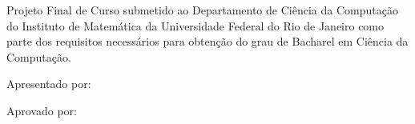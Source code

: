 \documentclass[brazil,pagestart=firstchapter]{abnt}
\begin{document}


\capa

\folhaderosto


\begin{folhadeaprovacao}

\setlength{\ABNTsignthickness}{0.4pt}
\setlength{\ABNTsignskip}{2cm}
\hspace*{1cm}

\centerline{\textbf{\large \ABNTtitulodata}}

\bigskip
\bigskip

\centerline{\textbf{\ABNTautordata}}

\bigskip
\bigskip

Projeto Final de Curso submetido ao Departamento de Ciência da Computação
do Instituto de Matemática da Universidade Federal do Rio de Janeiro como
parte dos requisitos necessários para obtenção do grau de Bacharel em
Ciência da Computação.

Apresentado por:

\assinatura{\ABNTautordata}

Aprovado por:


\bigskip
\bigskip
\bigskip

\begin{center}
\ABNTlocaldata

\ABNTdatadata
\end{center}

\end{folhadeaprovacao}




\end{document}

